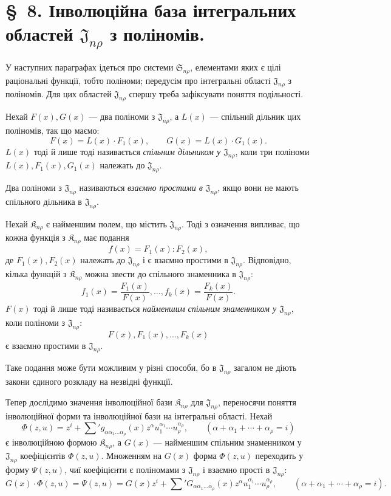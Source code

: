 \documentclass[11pt]{article}
\providecommand{\Kfield}{\mathfrak{K}}
\providecommand{\Ssys}{\mathfrak{S}}
\providecommand{\Jdom}{\mathfrak{J}}
\begin{document}
\section*{\S\ 8. Інволюційна база інтегральних областей $\Jdom_{n\rho}$ з поліномів.}

У наступних параграфах ідеться про системи $\Ssys_{n\rho}$, елементами яких є цілі раціональні функції, тобто поліноми; передусім про інтегральні області $\Jdom_{n\rho}$ з поліномів. Для цих областей $\Jdom_{n\rho}$ спершу треба зафіксувати поняття подільності.

Нехай $F(x),G(x)$ --- два поліноми з $\Jdom_{n\rho}$, а $L(x)$ --- спільний дільник цих поліномів, так що маємо:
\[
  F(x)=L(x)\cdot F_1(x),\qquad G(x)=L(x)\cdot G_1(x).
\]
$L(x)$ тоді й лише тоді називається \emph{спільним дільником у $\Jdom_{n\rho}$}, коли три поліноми $L(x),F_1(x),G_1(x)$ належать до $\Jdom_{n\rho}$.

Два поліноми з $\Jdom_{n\rho}$ називаються \emph{взаємно простими в $\Jdom_{n\rho}$}, якщо вони не мають спільного дільника в $\Jdom_{n\rho}$.

Нехай $\Kfield_{n\rho}$ є найменшим полем, що містить $\Jdom_{n\rho}$. Тоді з означення випливає, що кожна функція з $\Kfield_{n\rho}$ має подання
\[
  f(x)=F_1(x):F_2(x),
\]
де $F_1(x),F_2(x)$ належать до $\Jdom_{n\rho}$ і є взаємно простими в $\Jdom_{n\rho}$. Відповідно, кілька функцій з $\Kfield_{n\rho}$ можна звести до спільного знаменника в $\Jdom_{n\rho}$:
\[
  f_1(x)=\frac{F_1(x)}{F(x)},\ldots,
  f_k(x)=\frac{F_k(x)}{F(x)}.
\]
$F(x)$ тоді й лише тоді називається \emph{найменшим спільним знаменником у $\Jdom_{n\rho}$}, коли поліноми з $\Jdom_{n\rho}$:
\[
  F(x),F_1(x),\ldots,F_k(x)
\]
є взаємно простими в $\Jdom_{n\rho}$.

Таке подання може бути можливим у різні способи, бо в $\Jdom_{n\rho}$ загалом не діють закони єдиного розкладу на незвідні функції.

Тепер дослідимо значення інволюційної бази $\Kfield_{n\rho}$ для $\Jdom_{n\rho}$, переносячи поняття інволюційної форми та інволюційної бази на інтегральні області. Нехай
\[
  \Phi(z,u)=z^i+\sum{}' g_{\alpha\alpha_1\ldots\alpha_\rho}(x)
  z^\alpha u_1^{\alpha_1}\cdots u_\rho^{\alpha_\rho},
  \qquad
  (\alpha+\alpha_1+\cdots+\alpha_\rho=i)
\]
є інволюційною формою $\Kfield_{n\rho}$, а $G(x)$ --- найменшим спільним знаменником у $\Jdom_{n\rho}$ коефіцієнтів $\Phi(z,u)$. Множенням на $G(x)$ форма $\Phi(z,u)$ переходить у форму $\Psi(z,u)$, чиї коефіцієнти є поліномами з $\Jdom_{n\rho}$ і взаємно прості в $\Jdom_{n\rho}$:
\[
  G(x)\cdot\Phi(z,u)=\Psi(z,u)
  =G(x)z^i+
  \sum{}' G_{\alpha\alpha_1\ldots\alpha_\rho}(x)
  z^\alpha u_1^{\alpha_1}\cdots u_\rho^{\alpha_\rho},
  \qquad
  (\alpha+\alpha_1+\cdots+\alpha_\rho=i).
\]
\end{document}
